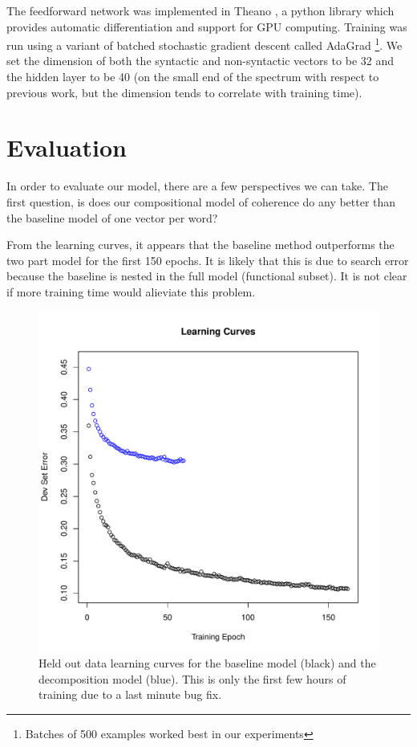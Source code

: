 \documentclass[11pt,letterpaper]{article}
\begin{document}
The feedforward network was implemented in Theano \cite{theano},
a python library which provides automatic differentiation and support for GPU computing.
Training was run using a variant of batched stochastic gradient descent called AdaGrad \cite{adagrad}
\footnote{Batches of 500 examples worked best in our experiments}.
We set the dimension of both the syntactic and non-syntactic vectors to be 32
and the hidden layer to be 40
(on the small end of the spectrum with respect to previous work,
but the dimension tends to correlate with training time).









\section{Evaluation} %
In order to evaluate our model, there are a few perspectives we can take.
The first question, is does our compositional model of coherence do any better
than the baseline model of one vector per word?

From the learning curves, it appears that the baseline method outperforms
the two part model for the first 150 epochs. It is likely that this is due
to search error because the baseline is nested in the full model (functional subset).
It is not clear if more training time would alieviate this problem.
\begin{figure}[ht]
\includegraphics[width=\linewidth]{learningCurve.pdf}
\caption{Held out data learning curves for the baseline model (black) and the
decomposition model (blue). This is only the first few hours of training
due to a last minute bug fix.}
\end{figure}
\end{document}
